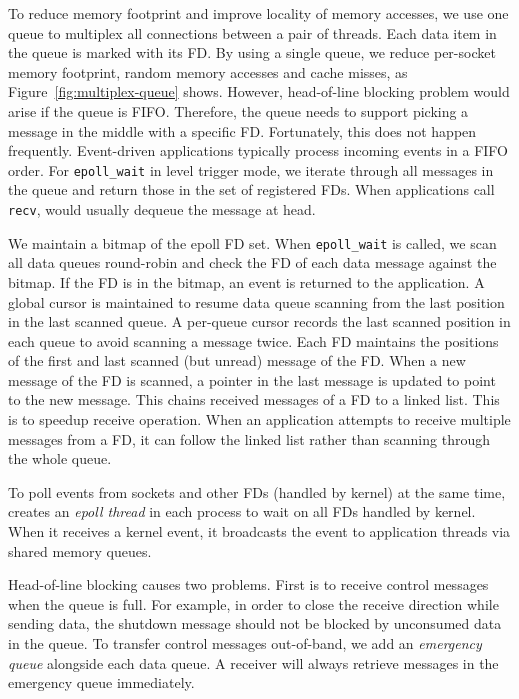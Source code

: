 To reduce memory footprint and improve locality of memory accesses, we use one queue to multiplex all connections between a pair of threads. Each data item in the queue is marked with its FD. By using a single queue, we reduce per-socket memory footprint, random memory accesses and cache misses, as Figure~\ref{fig:multiplex-queue} shows. However, head-of-line blocking problem would arise if the queue is FIFO. 
Therefore, the queue needs to support picking a message in the middle with a specific FD. 
Fortunately, this does not happen frequently. Event-driven applications typically process incoming events in a FIFO order. For \texttt{epoll\_wait} in level trigger mode, we iterate through all messages in the queue and return those in the set of registered FDs. When applications call \texttt{recv}, \libipc{} would usually dequeue the message at head.

We maintain a bitmap of the epoll FD set.
When \texttt{epoll\_wait} is called, we scan all data queues round-robin and check the FD of each data message against the bitmap. If the FD is in the bitmap, an event is returned to the application.
A global cursor is maintained to resume data queue scanning from the last position in the last scanned queue.
A per-queue cursor records the last scanned position in each queue to avoid scanning a message twice.
Each FD maintains the positions of the first and last scanned (but unread) message of the FD.
When a new message of the FD is scanned, a pointer in the last message is updated to point to the new message. This chains received messages of a FD to a linked list.
This is to speedup receive operation. When an application attempts to receive multiple messages from a FD, it can follow the linked list rather than scanning through the whole queue.

To poll events from sockets and other FDs (handled by kernel) at the same time, \libipc{} creates an \textit{epoll thread} in each process to wait on all FDs handled by kernel. When it receives a kernel event, it broadcasts the event to application threads via shared memory queues. %

Head-of-line blocking causes two problems.
First is to receive control messages when the queue is full. For example, in order to close the receive direction while sending data, the shutdown message should not be blocked by unconsumed data in the queue. To transfer control messages out-of-band, we add an \textit{emergency queue} alongside each data queue.
A receiver will always retrieve messages in the emergency queue immediately.


